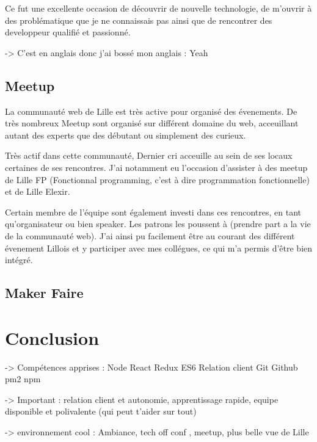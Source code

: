 \bigskip

Ce fut une excellente occasion de découvrir de nouvelle technologie, de
m'ouvrir à des problématique que je ne connaissais pas ainsi que de
rencontrer des developpeur qualifié et passionné.

-\textgreater{} C'est en anglais donc j'ai bossé mon anglais : Yeah

\subsection{Meetup}\label{meetup}

\bigskip

La communauté web de Lille est très active pour organisé des évenements.
De très nombreux Meetup sont organisé sur différent domaine du web,
acceuillant autant des experts que des débutant ou simplement des
curieux.

\bigskip

Très actif dans cette communauté, Dernier cri acceuille au sein de ses
locaux certaines de ses rencontres. J'ai notamment eu l'occasion
d'assister à des meetup de Lille FP (Fonctionnal programming, c'est à
dire programmation fonctionnelle) et de Lille Elexir.

\bigskip

Certain membre de l'équipe sont également investi dans ces rencontres,
en tant qu'organisateur ou bien speaker. Les patrons les poussent à
(prendre part a la vie de la communauté web). J'ai ainsi pu facilement
être au courant des différent évenement Lillois et y participer avec mes
collégues, ce qui m'a permis d'être bien intégré.

\bigskip

\subsection{Maker Faire}\label{maker-faire}

\bigskip

\bigskip

\section{Conclusion}\label{conclusion-1}

-\textgreater{} Compétences apprises : Node React Redux ES6 Relation
client Git Github pm2 npm

-\textgreater{} Important : relation client et autonomie, apprentissage
rapide, equipe disponible et polivalente (qui peut t'aider sur tout)

-\textgreater{} environnement cool : Ambiance, tech off conf , meetup,
plus belle vue de Lille
